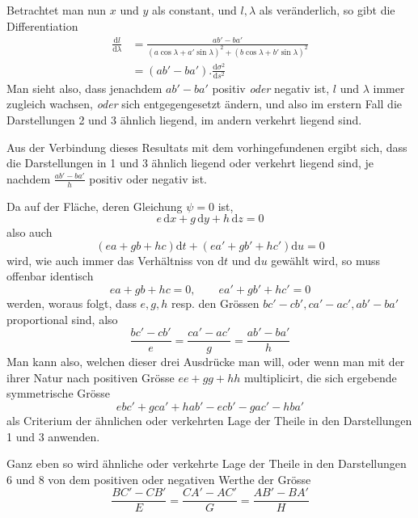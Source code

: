 %
\noindent Betrachtet man nun \(x\) und \(y\) als constant, und \(l,\lambda\) als veränderlich, so gibt die Differentiation
\[
\begin{aligned}
\frac{\mathrm{d}l}{\mathrm{d}\lambda}&=\frac{ab'-ba'}{(a\cos\lambda+a'\sin\lambda)^2+(b\cos\lambda+b'\sin\lambda)^2}\\
&=(ab'-ba')\mathord{.}\frac{\mathrm{d}\sigma^2}{\mathrm{d}s^2}
\end{aligned}
\]
\noindent Man sieht also, dass jenachdem \(ab'-ba'\) positiv \textit{oder} negativ ist, \(l\) und \(\lambda\) immer zugleich wachsen, \textit{oder} sich entgegengesetzt ändern, und also im erstern Fall die Darstellungen 2 und 3 ähnlich liegend, im andern verkehrt liegend sind.

Aus der Verbindung dieses Resultats mit dem vorhingefundenen ergibt sich, dass die Darstellungen in 1 und 3 ähnlich liegend oder verkehrt liegend sind, je nachdem \(\frac{ab'-ba'}{h}\) positiv oder negativ ist.

Da auf der Fläche, deren Gleichung \(\psi=0\) ist,
\[
e\,\mathrm{d}x+g\,\mathrm{d}y+h\,\mathrm{d}z=0
\]
\noindent also auch
\[
(ea+gb+hc)\mathrm{d}t+(ea'+gb'+hc')\mathrm{d}u=0
\]
\noindent wird, wie auch immer das Verhältniss von \(\mathrm{d}t\) und \(\mathrm{d}u\) gewählt wird, so muss offenbar identisch
\[
ea+gb+hc=0,\qquad ea'+gb'+hc'=0
\]
\noindent werden, woraus folgt, dass \(e,g,h\) resp. den Grössen \(bc'-cb',ca'-ac',ab'-ba'\) proportional sind, also
\[
\frac{bc'-cb'}{e}=\frac{ca'-ac'}{g}=\frac{ab'-ba'}{h}
\]
\noindent Man kann also, welchen dieser drei Ausdrücke man will, oder wenn man mit der ihrer Natur nach positiven Grösse \(ee+gg+hh\) multiplicirt, die sich ergebende symmetrische Grösse
\[
ebc'+gca'+hab'-ecb'-gac'-hba'
\]
\noindent als Criterium der ähnlichen oder verkehrten Lage der Theile in den Darstellungen 1 und 3 anwenden.

Ganz eben so wird ähnliche oder verkehrte Lage der Theile in den Darstellungen 6 und 8 von dem positiven oder negativen Werthe der Grösse
\[
\frac{BC'-CB'}{E}=\frac{CA'-AC'}{G}=\frac{AB'-BA'}{H}
\]
